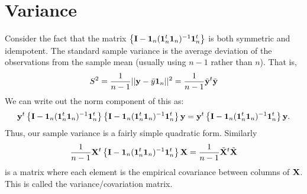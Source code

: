 \section{Variance}
Consider the fact that the matrix $\left\{ \mathbf{I} - \mathbf{1}_n (\mathbf{1}_n^t \mathbf{1}_n)^{-1} \mathbf{1}_n^t \right\}$
is both symmetric and idempotent. The standard sample variance is the average deviation of the
observations from the sample mean (usually using $n-1$ rather than $n$). That is,
$$
S^2 = \frac{1}{n-1}|| \mathbf{y} - \bar y \mathbf{1}_n ||^2 = \frac{1}{n-1} \tilde {\mathbf{y}}^t \tilde {\mathbf{y}}
$$
We can write out the norm component of this as: 
$$
\mathbf{y}^t \left\{ \mathbf{I} - \mathbf{1}_n (\mathbf{1}_n^t \mathbf{1}_n)^{-1} \mathbf{1}_n^t \right\}
\left\{ \mathbf{I} - \mathbf{1}_n (\mathbf{1}_n^t \mathbf{1}_n)^{-1} \mathbf{1}_n^t \right\} \mathbf{y}
= \mathbf{y}^t \left\{ \mathbf{I} - \mathbf{1}_n (\mathbf{1}_n^t \mathbf{1}_n)^{-1} \mathbf{1}_n^t \right\}\mathbf{y}.
$$
Thus, our sample variance is a fairly simple quadratic form. Similarly
$$
\frac{1}{n-1} \mathbf{X}^t \left\{ \mathbf{I} - \mathbf{1}_n (\mathbf{1}_n^t \mathbf{1}_n)^{-1} \mathbf{1}_n^t \right\} \mathbf{X}
= \frac{1}{n-1} \tilde {\mathbf{X}}^t \tilde {\mathbf{X}}
$$
is a matrix where each element is the empirical covariance between columns of $\mathbf{X}$.
This is called the variance/covariation matrix. 








